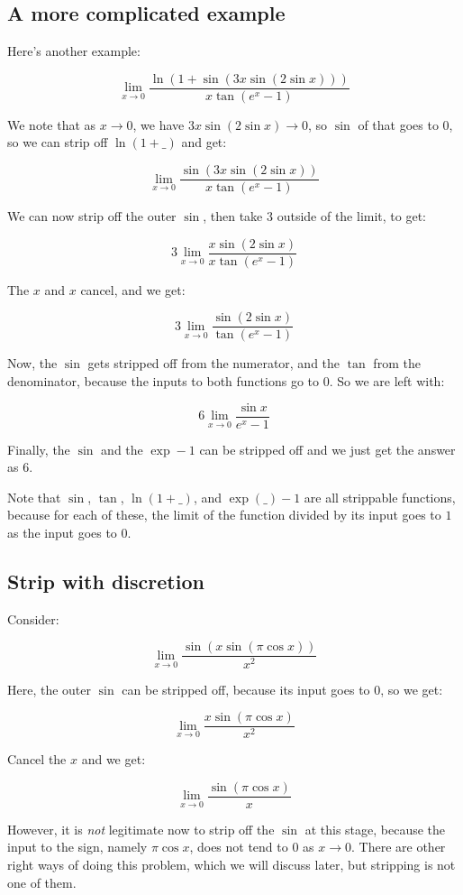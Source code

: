 \documentclass{amsart}
\begin{document}
\subsection{A more complicated example}

Here's another example:

$$\lim_{x \to 0} \frac{\ln(1 + \sin(3x\sin(2\sin x)))}{x \tan(e^x - 1)}$$

We note that as $x \to 0$, we have $3x \sin(2 \sin x) \to 0$, so
$\sin$ of that goes to $0$, so we can strip off $\ln (1 + \_)$ and get:

$$\lim_{x \to 0} \frac{\sin(3x\sin(2\sin x))}{x \tan(e^x - 1)}$$

We can now strip off the outer $\sin$, then take $3$ outside of the
limit, to get:

$$3 \lim_{x \to 0} \frac{x\sin(2\sin x)}{x \tan(e^x - 1)}$$

The $x$ and $x$ cancel, and we get:

$$3 \lim_{x \to 0} \frac{\sin(2\sin x)}{\tan(e^x - 1)}$$

Now, the $\sin$ gets stripped off from the numerator, and the $\tan$
from the denominator, because the inputs to both functions go to $0$. So we are left with:

$$6 \lim_{x \to 0} \frac{\sin x}{e^x - 1}$$

Finally, the $\sin$ and the $\exp - 1$ can be stripped off and we just
get the answer as $6$.

Note that $\sin$, $\tan$, $\ln(1 + \_)$, and $\exp(\_) - 1$ are all
strippable functions, because for each of these, the limit of the
function divided by its input goes to $1$ as the input goes to $0$.

\subsection{Strip with discretion}

Consider:

$$\lim_{x \to 0} \frac{\sin(x\sin(\pi \cos x))}{x^2}$$

Here, the outer $\sin$ can be stripped off, because its input goes to
$0$, so we get:

$$\lim_{x \to 0} \frac{x \sin(\pi \cos x)}{x^2}$$

Cancel the $x$ and we get:

$$\lim_{x \to 0} \frac{\sin(\pi \cos x)}{x}$$

However, it is {\em not} legitimate now to strip off the $\sin$ at
this stage, because the input to the sign, namely $\pi \cos x$, does
not tend to $0$ as $x \to 0$. There are other right ways of doing this
problem, which we will discuss later, but stripping is not one of them.
\end{document}
